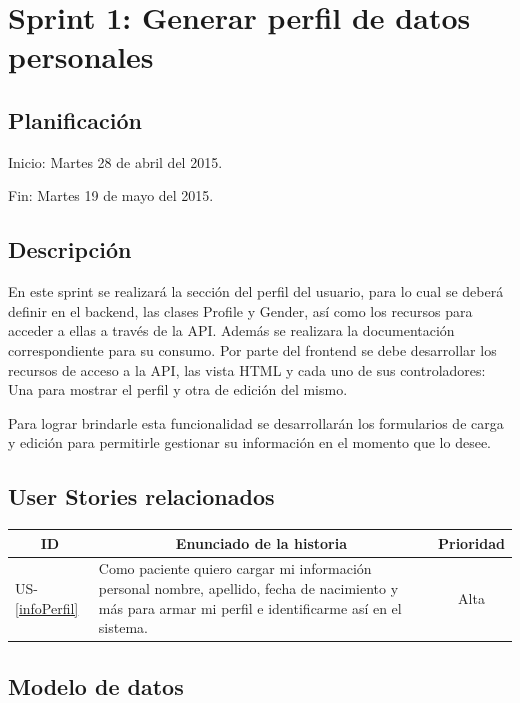 \section{Sprint 1: Generar perfil de datos personales}
\subsection{Planificación}
Inicio: Martes 28 de abril del 2015.

Fin: Martes 19 de mayo del 2015.

\subsection{Descripción}
En este sprint se realizará la sección del perfil del usuario, para lo cual se deberá definir en el backend, las clases Profile y Gender, así como los recursos para acceder a ellas a través de la API. Además se realizara la documentación correspondiente para su consumo.
Por parte del frontend se debe desarrollar los recursos de acceso a la API, las vista HTML y cada uno de sus controladores: Una para mostrar el perfil y otra de edición del mismo.

Para lograr brindarle esta funcionalidad se desarrollarán los formularios de carga y edición para permitirle gestionar su información en el momento que lo desee.

\subsection{User Stories relacionados}
{\scriptsize
\begin{table}[h]
	\begin{tabular}{|l|p{10cm}|c|}
	\hline
        \multicolumn{1}{|c|}{\textbf{ID}} &
        \multicolumn{1}{|c|}{\textbf{Enunciado de la historia}} &
        \textbf{Prioridad} \\     
    \hline
        US-\ref{infoPerfil} &
        Como paciente quiero cargar mi información personal nombre, apellido, fecha de nacimiento y más para armar mi perfil e identificarme así en el sistema.& Alta
        \\
    \hline 
	 \end{tabular}
\end{table}
}




\subsection{Modelo de datos}


